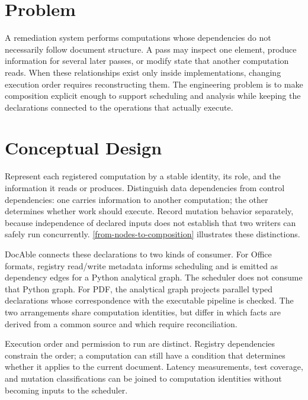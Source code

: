 
\section{Problem}

A remediation system performs computations whose dependencies do not necessarily follow document structure. A pass may inspect one element, produce information for several later passes, or modify state that another computation reads. When these relationships exist only inside implementations, changing execution order requires reconstructing them. The engineering problem is to make composition explicit enough to support scheduling and analysis while keeping the declarations connected to the operations that actually execute.

\section{Conceptual Design}

Represent each registered computation by a stable identity, its role, and the information it reads or produces. Distinguish data dependencies from control dependencies: one carries information to another computation; the other determines whether work should execute. Record mutation behavior separately, because independence of declared inputs does not establish that two writers can safely run concurrently. \autoref{from-nodes-to-composition} illustrates these distinctions.

DocAble connects these declarations to two kinds of consumer. For Office formats, registry read/write metadata informs scheduling and is emitted as dependency edges for a Python analytical graph. The scheduler does not consume that Python graph. For PDF, the analytical graph projects parallel typed declarations whose correspondence with the executable pipeline is checked. The two arrangements share computation identities, but differ in which facts are derived from a common source and which require reconciliation.

Execution order and permission to run are distinct. Registry dependencies constrain the order; a computation can still have a condition that determines whether it applies to the current document. Latency measurements, test coverage, and mutation classifications can be joined to computation identities without becoming inputs to the scheduler.


